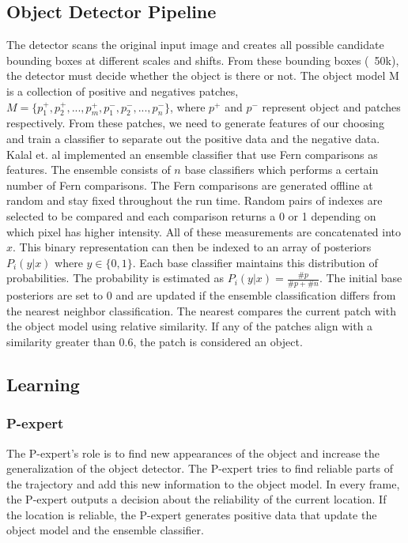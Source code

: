 \documentclass[10pt,twocolumn,letterpaper]{article}
\begin{document}
\subsection{Object Detector Pipeline}
	The detector scans the original input image and creates all possible candidate bounding boxes at different scales and shifts. From these bounding boxes (~50k), the detector must decide whether the object is there or not. The object model M is a collection of positive and negatives patches, $M =\{p_1^+,p_2^+, ..., p_m^+, p_1^-,p_2^-,...,p_n^-\}$, where $p^+$ and $p^-$ represent object and patches respectively. From these patches, we need to generate features of our choosing and train a classifier to separate out the positive data and the negative data. Kalal et. al implemented an ensemble classifier that use Fern comparisons as features. The ensemble consists of $n$ base classifiers which performs a certain number of Fern comparisons. The Fern comparisons are generated offline at random and stay fixed throughout the run time. Random pairs of indexes are selected to be compared and each comparison returns a 0 or 1 depending on which pixel has higher intensity. All of these measurements are concatenated into $x$. This binary representation can then be indexed to an array of posteriors $P_i(y|x)$ where $y \in \{0,1\}$.  Each base classifier maintains this distribution of probabilities. The probability is estimated as $P_i(y|x) = \frac{\#p}{\#p + \#n}$. The initial base posteriors are set to 0 and are updated if the ensemble classification differs from the nearest neighbor classification. The nearest compares the current patch with the object model using relative similarity. If any of the patches align with a similarity greater than 0.6, the patch is considered an object. 
\subsection{Learning}
\subsubsection {P-expert}
The P-expert's role is to find new appearances of the object and increase the generalization of the object detector. The P-expert tries to find reliable parts of the trajectory and add this new information to the object model. In every frame, the P-expert outputs a decision about the reliability of the current location. If the location is reliable, the P-expert generates positive data that update the object model and the ensemble classifier.
\end{document}
